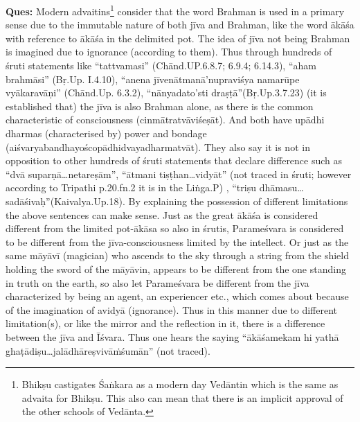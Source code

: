 \textbf{Ques:} Modern advaitins\footnote{Bhikṣu castigates Śaṅkara as a modern day Vedāntin which is the same as advaita for Bhikṣu. This also can mean that there is an implicit approval of the other schools of Vedānta.} consider that the word Brahman is used in a primary sense due to the immutable nature of both jīva and Brahman, like the word ākāśa with reference to ākāśa in the delimited pot. The idea of jīva not being Brahman is imagined due to ignorance (according to them). Thus through hundreds of śruti statements like “tattvamasi” (Chānd.UP.6.8.7; 6.9.4; 6.14.3), “aham brahmāsi” (Bṛ.Up. I.4.10), “anena jīvenātmanā’nupraviśya namarūpe vyākaravāṇi” (Chānd.Up. 6.3.2), “nānyadato’sti draṣṭā”(Bṛ.Up.3.7.23) (it is established that) the jīva is also Brahman alone, as there is the common characteristic of consciousness (cinmātratvāviśeṣāt). And both have upādhi dharmas (characterised by) power and bondage (aiśvaryabandhayoścopādhidvayadharmatvāt). They also say it is not in opposition to other hundreds of śruti statements that declare difference such as “dvā suparṇā\-…netareṣām”, “ātmani tiṣṭhan…vidyāt” (not traced in śruti; however according to Tripathi p.20.fn.2 it is in the Liṅga.P) , “triṣu dhāmasu…\-sadāśivaḥ”(Kaivalya.Up.18). By explaining the possession of different limitations the above sentences can make sense. Just as the great ākāśa is considered different from the limited pot-ākāsa so also in śrutis, Parameśvara is considered to be different from the jīva-consciousness limited by the intellect. Or just as the same māyāvī (magician) who ascends to the sky through a string from the shield holding the sword of the māyāvin, appears to be different from the one standing in truth on the earth, so also let Parameśvara be different from the jīva characterized by being an agent, an experiencer etc., which comes about because of the imagination of avidyā (ignorance). Thus in this manner due to   different limitation(s), or like the mirror and the reflection in it, there is a difference between the jīva and Īśvara. Thus one hears the saying “ākāśamekam hi yathā ghaṭādiṣu…jalādhāreṣvivāṁśumān” (not traced). 


